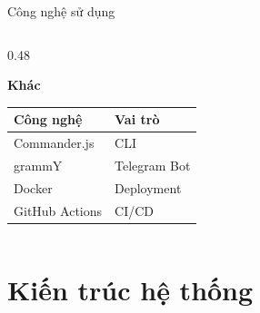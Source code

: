 \documentclass[aspectratio=169,12pt]{beamer}
\begin{document}
\begin{frame}{Công nghệ sử dụng}
\begin{columns}[T]
\begin{column}{0.48\textwidth}
            \vspace{0.5cm}

            \textbf{ Khác}
            \begin{tabular}{ll}
                \toprule
                Công nghệ & Vai trò \\
                \midrule
                Commander.js & CLI \\
                grammY & Telegram Bot \\
                Docker & Deployment \\
                GitHub Actions & CI/CD \\
                \bottomrule
            \end{tabular}
        \end{column}
    \end{columns}
\end{frame}

\section{Kiến trúc hệ thống}
\end{document}
